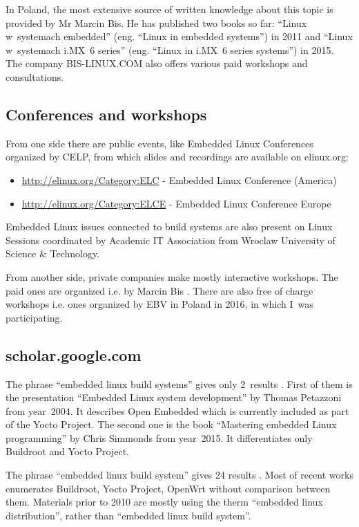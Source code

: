 \documentclass[printmode]{mgr}
\begin{document}
In Poland, the most extensive source of written knowledge about this topic is provided by Mr Marcin Bis.
He has published two books so far: ``Linux w~systemach embedded'' (eng. ``Linux in embedded systems'') in 2011 and ``Linux w~systemach i.MX~6 series'' (eng. ``Linux in i.MX~6 series systems'') in 2015.
The company BIS-LINUX.COM also offers various paid workshops and consultations.

\subsection*{Conferences and workshops}

From one side there are public events, like Embedded Linux Conferences organized by CELP, from which slides and recordings are available on elinux.org:

\begin{itemize}
  \item \url{http://elinux.org/Category:ELC} - Embedded Linux Conference (America)
  \item \url{http://elinux.org/Category:ELCE} - Embedded Linux Conference Europe
\end{itemize}

Embedded Linux issues connected to build systems are also present on Linux Sessions \cite{web:sesja-linuksowa} coordinated by Academic IT Association from Wroclaw University of Science \& Technology.

From another side, private companies make mostly interactive workshops. The paid ones are organized i.e. by Marcin Bis \cite{web:bis-szkolenia}. There are also free of charge workshops i.e. ones organized by EBV in Poland in 2016, in which I~was participating.

\subsection*{scholar.google.com}
The phrase ``embedded linux build systems'' gives only 2~results  \cite{web:scholar-1}. First of them is the presentation ``Embedded Linux system development'' by Thomas Petazzoni from year~2004. It describes Open Embedded which is currently included as part of the Yocto Project. The second one is the book ``Mastering embedded Linux programming'' by Chris Simmonds from year~2015. It differentiates only Buildroot and Yocto Project.

The phrase ``embedded linux build system'' gives 24 results \cite{web:scholar-2}. Most of recent works enumerates Buildroot, Yocto Project, OpenWrt without comparison between them. Materials prior to 2010 are mostly using the therm ``embedded linux distribution'', rather than ``embedded linux build system''.
\end{document}
